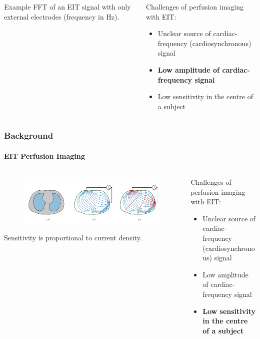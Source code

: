 \documentclass[10pt,    %
    english,            %
    xcolor=table,       %
    envcountsect,        %
    aspectratio=1610
]{beamer}
\begin{document}
\begin{frame}
\begin{columns}[c]
\begin{column}{0.5\textwidth}
\begin{figure}
	\end{figure}
	Example FFT of an EIT signal with only external electrodes (\alert{frequency in Hz}).
\end{column}
\begin{column}{0.5\textwidth}
	Challenges of perfusion imaging with EIT: \\ \vspace{5mm}
	\begin{itemize}
		\item Unclear source of cardiac-frequency (cardiosynchronous) signal
		\item \textbf{Low amplitude of cardiac-frequency signal}
		\item Low sensitivity in the centre of a subject
	\end{itemize}
\end{column}
\end{columns}
\end{frame}

\begin{frame}
	\frametitle{Background}
	\framesubtitle{EIT Perfusion Imaging}
\begin{columns}[c]
\begin{column}{0.5\textwidth}
	\begin{figure}
		\centering
	\includegraphics[width=\textwidth,trim={16cm 3cm 16cm 0},clip]{imgs/current_and_equipotential_lines.pdf}
	\end{figure}
	\alert{Sensitivity} is proportional to \alert{current density}.
\end{column}
\begin{column}{0.5\textwidth}
	Challenges of perfusion imaging with EIT: \\ \vspace{5mm}
	\begin{itemize}
		\item Unclear source of cardiac-frequency (cardiosynchronous) signal
		\item Low amplitude of cardiac-frequency signal
		\item \textbf{Low sensitivity in the centre of a subject}
	\end{itemize}
\end{column}
\end{columns}
\end{frame}
\end{document}

